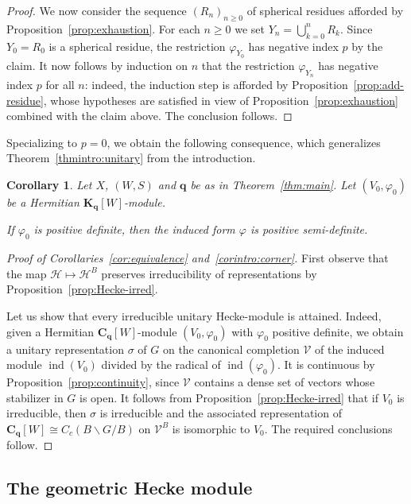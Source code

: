 \documentclass[12pt,a4paper]{amsproc}
\newtheorem{corollary}[theorem]{Corollary}
\theoremstyle{definition}
\DeclareMathOperator{\Ind}{ind}
\newcommand{\CC}{\mathbf C}
\newcommand{\KK}{\mathbf K}
\begin{document}
\begin{proof}
\medskip
We now consider the sequence $(R_n)_{n \geq 0}$ of spherical residues afforded by Proposition~\ref{prop:exhaustion}. For each $n \geq 0$ we set $Y_n = \bigcup_{k =0}^n R_k$. Since $Y_0 = R_0$ is a spherical residue, the restriction $\varphi_{Y_0}$ has negative index $p$ by the claim. It now follows by induction on $n$ that the restriction $\varphi_{Y_n}$ has negative index $p$ for all $n$: indeed, the induction step is afforded by Proposition~\ref{prop:add-residue}, whose hypotheses are satisfied in view of Proposition~\ref{prop:exhaustion} combined with the claim above. The conclusion follows. 
\end{proof}


Specializing to $p=0$, we obtain the following consequence, which generalizes Theorem~\ref{thmintro:unitary} from the introduction. 

\begin{corollary}\label{cor:main}
Let $X$, $(W, S)$ and $\mathbf q$ be as in Theorem~\ref{thm:main}. Let $(V_0, \varphi_0)$ be a Hermitian $\KK_{\mathbf q}[W]$-module. 

If $\varphi_0$ is positive definite, then the induced form $\varphi$ is positive semi-definite. 
\end{corollary}

\begin{proof}[Proof of Corollaries~\ref{cor:equivalence} and~\ref{corintro:corner}]
First observe that the map $\mathcal H \mapsto \mathcal H^B$ preserves irreducibility of representations by Proposition~\ref{prop:Hecke-irred}. 

Let us show that every irreducible unitary Hecke-module is attained. Indeed, given a Hermitian $\CC_{\mathbf q}[W]$-module $(V_0, \varphi_0)$ with $\varphi_0$ positive definite, we obtain a unitary representation $\sigma$ of $G$ on the canonical completion $\mathcal V$ of the induced module $\Ind(V_0)$ divided by the radical of $\Ind(\varphi_0)$. It is continuous by Proposition~\ref{prop:continuity}, since $\mathcal V$ contains a dense set of vectors whose stabilizer in $G$ is open. It follows from Proposition~\ref{prop:Hecke-irred} that if  $V_0$ is irreducible, then $\sigma$ is irreducible and the associated representation of $\CC_{\mathbf q}[W] \cong C_c(B\backslash G/B)$ on $\mathcal V^B$ is isomorphic to $V_0$. The required conclusions follow.
\end{proof}
	

\subsection{The geometric Hecke module}\label{sec:geom-Hecke-module}
					
\end{document}
